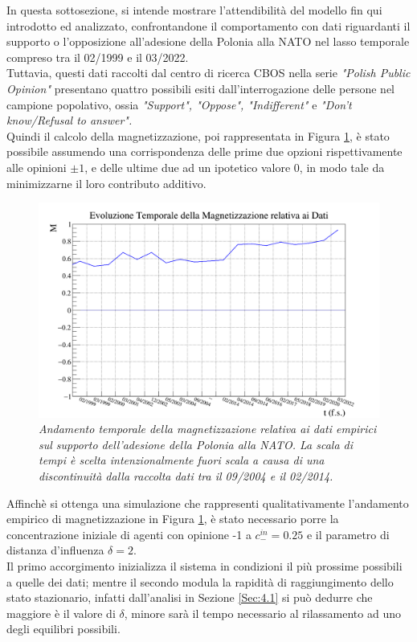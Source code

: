\documentclass[letterpaper,10pt]{article}
\begin{document}
In questa sottosezione, si intende mostrare l'attendibilità del modello fin qui introdotto ed analizzato, confrontandone il comportamento con dati riguardanti il supporto o l'opposizione all'adesione della Polonia alla NATO nel lasso temporale compreso tra il 02/1999 e il 03/2022.
\\ Tuttavia, questi dati raccolti dal centro di ricerca CBOS \cite{cbos} nella serie \textit{"Polish Public Opinion"} presentano quattro possibili esiti dall'interrogazione delle persone nel campione popolativo, ossia \textit{"Support", "Oppose", "Indifferent"} e \textit{"Don't know/Refusal to answer".}
\\ Quindi il calcolo della magnetizzazione, poi rappresentata in  Figura \ref{Fig:20}, è stato possibile assumendo una corrispondenza delle prime due opzioni rispettivamente alle opinioni $\pm1$, e delle ultime due ad un ipotetico valore 0, in modo tale da minimizzarne il loro contributo additivo. 

\begin{figure}[h]
\centering
\includegraphics[width = 1.1\linewidth]{poland_magnetization_graph.png}
\caption{\textit{Andamento temporale della magnetizzazione relativa ai dati empirici sul supporto dell'adesione della Polonia alla NATO. La scala di tempi è scelta intenzionalmente fuori scala a causa di una discontinuità dalla raccolta dati tra il 09/2004 e il 02/2014. }}
\label{Fig:20}
\end{figure}

\[\]
Affinchè si ottenga una simulazione che rappresenti qualitativamente l'andamento empirico di magnetizzazione in Figura \ref{Fig:20}, è stato necessario porre la concentrazione iniziale di agenti con opinione -1 a $c_{-}^{in}=0.25$ e il parametro di distanza d'influenza $\delta=2$.
\\ Il primo accorgimento inizializza il sistema in condizioni il più prossime possibili a quelle dei dati; mentre il secondo modula la rapidità di raggiungimento dello stato stazionario, infatti dall'analisi in Sezione \ref{Sec:4.1} si può dedurre che maggiore è il valore di $\delta$, minore sarà il tempo necessario al rilassamento ad uno degli equilibri possibili.
\end{document}
